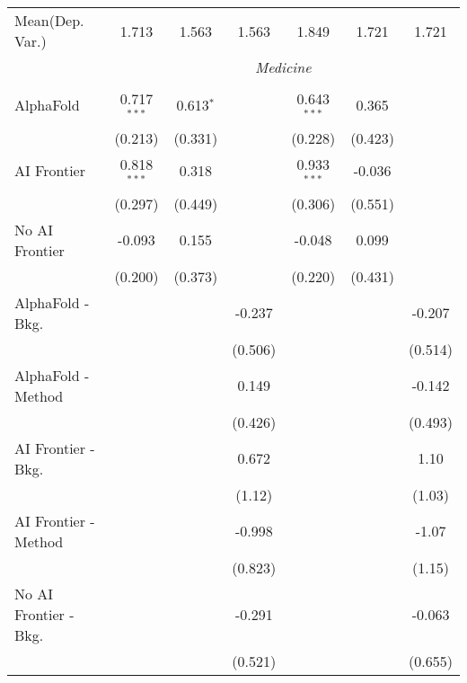 \begin{tabular}{lcccccc}
Mean(Dep. Var.) & 1.713 & 1.563 & 1.563 & 1.849 & 1.721 & 1.721 \\
 & \multicolumn{6}{c}{\textit{Medicine}} \\ \\
   AlphaFold               & 0.717$^{***}$ & 0.613$^{*}$ &               & 0.643$^{***}$ & 0.365   &   \\   
                           & (0.213)       & (0.331)     &               & (0.228)       & (0.423) &   \\   
   AI Frontier             & 0.818$^{***}$ & 0.318       &               & 0.933$^{***}$ & -0.036  &   \\   
                           & (0.297)       & (0.449)     &               & (0.306)       & (0.551) &   \\   
   No AI Frontier          & -0.093        & 0.155       &               & -0.048        & 0.099   &   \\   
                           & (0.200)       & (0.373)     &               & (0.220)       & (0.431) &   \\   
   AlphaFold - Bkg.        &               &             & -0.237        &               &         & -0.207\\   
                           &               &             & (0.506)       &               &         & (0.514)\\   
   AlphaFold - Method      &               &             & 0.149         &               &         & -0.142\\   
                           &               &             & (0.426)       &               &         & (0.493)\\   
   AI Frontier - Bkg.      &               &             & 0.672         &               &         & 1.10\\   
                           &               &             & (1.12)        &               &         & (1.03)\\   
   AI Frontier - Method    &               &             & -0.998        &               &         & -1.07\\   
                           &               &             & (0.823)       &               &         & (1.15)\\   
   No AI Frontier - Bkg.   &               &             & -0.291        &               &         & -0.063\\   
                           &               &             & (0.521)       &               &         & (0.655)\\   

\end{tabular}
